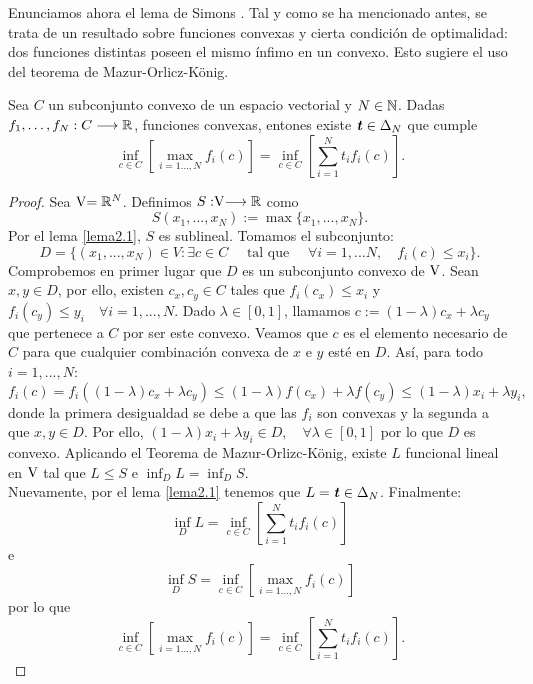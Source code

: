 Enunciamos ahora el lema de Simons \cite{Simons2008}. Tal y como se ha mencionado antes, se trata de un resultado sobre funciones convexas y cierta condición de optimalidad: dos funciones distintas poseen el mismo ínfimo en un convexo. Esto sugiere el uso del teorema de Mazur-Orlicz-König.
\bigskip
\begin{lemaBox}[Simons]\label{Simons}
	Sea $ C $ un subconjunto convexo de un espacio vectorial y $ N \in \mathbb{N} $. Dadas $  $ $ f_1, \dots, f_N : C \longrightarrow \mathbb{R} $, funciones convexas, entones existe $ \textbf{\emph{t}} \in \Delta_N $ que cumple
	\[
	\inf_{c \in C}\left[ \max_{i=1\dots,N } f_i(c)\right] = \inf_{c \in C} \left[ \sum_{i=1}^{N} t_i f_i(c) \right].
	\] 
\end{lemaBox}
\begin{proof}
	Sea  $ \vecSpace = \RR^N $. Definimos $S:\vecSpace \longrightarrow \RR $ como \[ S(x_1, ..., x_N) := \max \{x_1, ..., x_N\}. \] Por el lema \ref{lema2.1}, $ S $ es sublineal. Tomamos el subconjunto:
	\[ 
	D = \{ (x_1, ..., x_N)\in V: \exists c \in C \quad \text{ tal que } \quad \forall i = 1,...N,\quad f_i(c) \leq x_i \}.
	\]
	Comprobemos en primer lugar que $ D $ es un subconjunto convexo de $ \vecSpace $. Sean $ x, y \in D $, por ello, existen $ c_x, c_y \in C $ tales que $ f_i (c_x) \leq x_i  $ y $ f_i (c_y) \leq y_i \quad \forall i=1,...,N $. Dado $ \lambda \in [0,1] $, llamamos $ c := (1-\lambda)c_x + \lambda c_y $ que pertenece a $ C $ por ser este convexo. Veamos que $ c $ es el elemento necesario de $ C $ para que cualquier combinación convexa de $ x $ e $ y $ esté en $ D $. Así, para todo $ i =1,...,N  $:	
	\[
	f_i(c) = f_i((1-\lambda)c_x + \lambda c_y) \leq (1-\lambda)f(c_x) + \lambda f(c_y) \leq (1-\lambda)x_i + \lambda y_i ,
	\]
	donde la primera desigualdad se debe a que las $ f_i $ son convexas y la segunda a que $ x,y \in D $. Por ello, $ (1-\lambda)x_i + \lambda y_i \in D , \quad \forall \lambda \in [0,1] $ por lo que $ D $ es convexo. Aplicando el Teorema de Mazur-Orlizc-König, existe $ L $ funcional lineal en $ \vecSpace $ tal que $ L \leq S $ e $ \inf_D L = \inf_D S $. \\
	
	Nuevamente, por el lema \ref{lema2.1} tenemos que $ L = \textbf{\emph{t}} \in \Delta_N$. Finalmente:
	\[
	\inf_D L =\inf_{c \in C} \left[ \sum_{i=1}^{N} t_i f_i(c) \right]
	\]
	e
	\[
	\inf_D S = \inf_{c \in C}\left[ \max_{i=1\dots,N } f_i(c)\right]
	\]
	por lo que 
	\[ \inf_{c \in C}\left[ \max_{i=1\dots,N } f_i(c)\right] = \inf_{c \in C} \left[ \sum_{i=1}^{N} t_i f_i(c) \right]. \] 
\end{proof}

